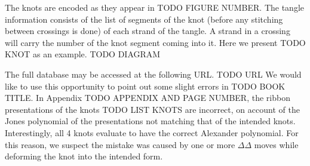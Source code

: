 \begin{paper}
The knots are encoded as they appear in TODO FIGURE NUMBER.
The tangle information consists of the list of segments of the knot (before any
stitching between crossings is done) of each strand of the tangle.
A strand in a crossing will carry the number of the knot segment coming into it.
Here we present TODO KNOT as an example.
TODO DIAGRAM

The full database may be accessed at the following URL.
TODO URL
We would like to use this opportunity to point out some slight errors in TODO
BOOK TITLE.
In Appendix TODO APPENDIX AND PAGE NUMBER, the ribbon presentations of the knots
TODO LIST KNOTS are incorrect, on account of the Jones polynomial of the
presentations not matching that of the intended knots.
Interestingly, all 4 knots evaluate to have the correct Alexander polynomial.
For this reason, we suspect the mistake was caused by one or more $\Delta\Delta$
moves while deforming the knot into the intended form.
\end{paper}

